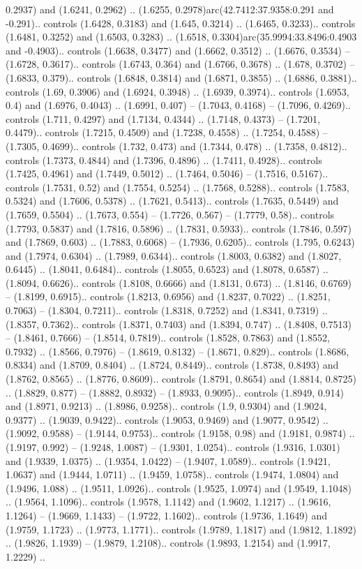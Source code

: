 0.2937) and (1.6241, 0.2962) .. (1.6255, 0.2978)arc(42.7412:37.9358:0.291 and -0.291).. controls (1.6428, 0.3183) and (1.645, 0.3214) .. (1.6465, 0.3233).. controls (1.6481, 0.3252) and (1.6503, 0.3283) .. (1.6518, 0.3304)arc(35.9994:33.8496:0.4903 and -0.4903).. controls (1.6638, 0.3477) and (1.6662, 0.3512) .. (1.6676, 0.3534) -- (1.6728, 0.3617).. controls (1.6743, 0.364) and (1.6766, 0.3678) .. (1.678, 0.3702) -- (1.6833, 0.379).. controls (1.6848, 0.3814) and (1.6871, 0.3855) .. (1.6886, 0.3881).. controls (1.69, 0.3906) and (1.6924, 0.3948) .. (1.6939, 0.3974).. controls (1.6953, 0.4) and (1.6976, 0.4043) .. (1.6991, 0.407) -- (1.7043, 0.4168) -- (1.7096, 0.4269).. controls (1.711, 0.4297) and (1.7134, 0.4344) .. (1.7148, 0.4373) -- (1.7201, 0.4479).. controls (1.7215, 0.4509) and (1.7238, 0.4558) .. (1.7254, 0.4588) -- (1.7305, 0.4699).. controls (1.732, 0.473) and (1.7344, 0.478) .. (1.7358, 0.4812).. controls (1.7373, 0.4844) and (1.7396, 0.4896) .. (1.7411, 0.4928).. controls (1.7425, 0.4961) and (1.7449, 0.5012) .. (1.7464, 0.5046) -- (1.7516, 0.5167).. controls (1.7531, 0.52) and (1.7554, 0.5254) .. (1.7568, 0.5288).. controls (1.7583, 0.5324) and (1.7606, 0.5378) .. (1.7621, 0.5413).. controls (1.7635, 0.5449) and (1.7659, 0.5504) .. (1.7673, 0.554) -- (1.7726, 0.567) -- (1.7779, 0.58).. controls (1.7793, 0.5837) and (1.7816, 0.5896) .. (1.7831, 0.5933).. controls (1.7846, 0.597) and (1.7869, 0.603) .. (1.7883, 0.6068) -- (1.7936, 0.6205).. controls (1.795, 0.6243) and (1.7974, 0.6304) .. (1.7989, 0.6344).. controls (1.8003, 0.6382) and (1.8027, 0.6445) .. (1.8041, 0.6484).. controls (1.8055, 0.6523) and (1.8078, 0.6587) .. (1.8094, 0.6626).. controls (1.8108, 0.6666) and (1.8131, 0.673) .. (1.8146, 0.6769) -- (1.8199, 0.6915).. controls (1.8213, 0.6956) and (1.8237, 0.7022) .. (1.8251, 0.7063) -- (1.8304, 0.7211).. controls (1.8318, 0.7252) and (1.8341, 0.7319) .. (1.8357, 0.7362).. controls (1.8371, 0.7403) and (1.8394, 0.747) .. (1.8408, 0.7513) -- (1.8461, 0.7666) -- (1.8514, 0.7819).. controls (1.8528, 0.7863) and (1.8552, 0.7932) .. (1.8566, 0.7976) -- (1.8619, 0.8132) -- (1.8671, 0.829).. controls (1.8686, 0.8334) and (1.8709, 0.8404) .. (1.8724, 0.8449).. controls (1.8738, 0.8493) and (1.8762, 0.8565) .. (1.8776, 0.8609).. controls (1.8791, 0.8654) and (1.8814, 0.8725) .. (1.8829, 0.877) -- (1.8882, 0.8932) -- (1.8933, 0.9095).. controls (1.8949, 0.914) and (1.8971, 0.9213) .. (1.8986, 0.9258).. controls (1.9, 0.9304) and (1.9024, 0.9377) .. (1.9039, 0.9422).. controls (1.9053, 0.9469) and (1.9077, 0.9542) .. (1.9092, 0.9588) -- (1.9144, 0.9753).. controls (1.9158, 0.98) and (1.9181, 0.9874) .. (1.9197, 0.992) -- (1.9248, 1.0087) -- (1.9301, 1.0254).. controls (1.9316, 1.0301) and (1.9339, 1.0375) .. (1.9354, 1.0422) -- (1.9407, 1.0589).. controls (1.9421, 1.0637) and (1.9444, 1.0711) .. (1.9459, 1.0758).. controls (1.9474, 1.0804) and (1.9496, 1.088) .. (1.9511, 1.0926).. controls (1.9525, 1.0974) and (1.9549, 1.1048) .. (1.9564, 1.1096).. controls (1.9578, 1.1142) and (1.9602, 1.1217) .. (1.9616, 1.1264) -- (1.9669, 1.1433) -- (1.9722, 1.1602).. controls (1.9736, 1.1649) and (1.9759, 1.1723) .. (1.9773, 1.1771).. controls (1.9789, 1.1817) and (1.9812, 1.1892) .. (1.9826, 1.1939) -- (1.9879, 1.2108).. controls (1.9893, 1.2154) and (1.9917, 1.2229) .. 